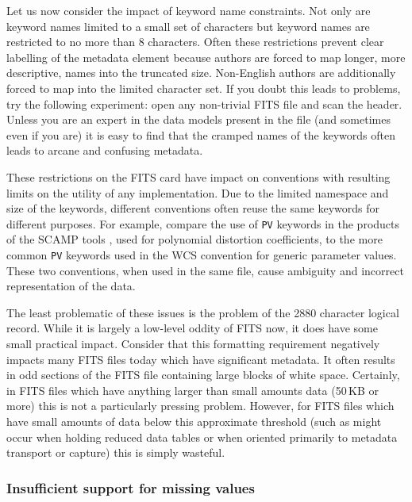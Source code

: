 \documentclass[final,authoryear,5p,times,twocolumn]{elsarticle}
\begin{document}
{{Let us now consider the impact of keyword name constraints. Not only
are keyword names limited to a small set of characters but keyword
names are restricted to no more than 8 characters. Often these
restrictions prevent clear labelling of the metadata element because
authors are forced to map longer, more descriptive, names into the
truncated size. Non-English authors are additionally forced to map
into the limited character set. If you doubt this leads to problems,
try the following experiment: open any non-trivial FITS file and scan
the header. Unless you are an expert in the data models present in the
file (and sometimes even if you are) it is easy to find that the
cramped names of the keywords often leads to arcane and confusing
metadata.


These restrictions on the FITS card have impact on conventions with
resulting limits on the utility of any implementation. Due to the limited
namespace and size of the keywords, different conventions often reuse
the same keywords for different purposes.  For example, compare the use
of \texttt{PV} keywords in the products of the SCAMP tools
\citep{2006ASPC..351..112B}, used for polynomial distortion coefficients,
to the more common \texttt{PV} keywords used in the WCS convention for generic
parameter values. These two conventions, when used in the same file,
cause ambiguity and incorrect representation of the data.


The least problematic of these issues is the problem of the 2880
character logical record. While
it is largely a low-level oddity of FITS now, it does have some small
practical impact. Consider that this formatting requirement negatively
impacts many FITS files today which have significant metadata. It
often results in odd sections of the FITS file containing large blocks
of white space. Certainly, in FITS files which have anything larger than
small amounts data (50\,KB or more) this is not a particularly pressing
problem. However, for FITS files which have small amounts of data
below this approximate threshold (such as might occur when holding
reduced data tables or when oriented primarily to metadata transport or
capture) this is simply wasteful.

\subsubsection{Insufficient support for missing values}

}}
\end{document}
